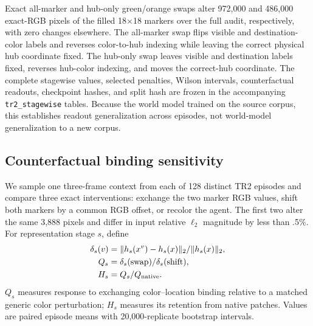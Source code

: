 \documentclass{article}
\begin{document}
Exact all-marker and hub-only green/orange swaps alter 972,000 and 486,000
exact-RGB pixels of the filled 18$\times$18 markers over the full audit,
respectively, with zero changes elsewhere.  The all-marker swap flips visible
and destination-color labels and reverses color-to-hub indexing while leaving
the correct physical hub coordinate fixed.  The hub-only swap leaves visible
and destination labels fixed, reverses hub-color indexing, and moves the
correct-hub coordinate.  The complete stagewise values,
selected penalties, Wilson intervals, counterfactual readouts, checkpoint
hashes, and split hash are frozen in the accompanying \texttt{tr2\_stagewise}
tables.  Because the world model trained on the source corpus, this establishes
readout generalization across episodes, not world-model generalization to a
new corpus.

\subsection{Counterfactual binding sensitivity}
\label{sec:counterfactual}

We sample one three-frame context from each of 128 distinct TR2 episodes and
compare three exact interventions: exchange the two marker RGB values, shift
both markers by a common RGB offset, or recolor the agent.  The first two alter
the same 3,888 pixels and differ in input relative $\ell_2$ magnitude by less
than .5\%.  For representation stage $s$, define
\begin{equation}
\begin{aligned}
 \delta_s(v)&=\|h_s(x^v)-h_s(x)\|_2/\|h_s(x)\|_2,\\
 Q_s&=\delta_s({\rm swap})/\delta_s({\rm shift}),\\
 H_s&=Q_s/Q_{\rm native}.
\end{aligned}
\end{equation}
$Q_s$ measures response to exchanging color--location binding relative to a
matched generic color perturbation; $H_s$ measures its retention from native
patches.  Values are paired episode means with 20,000-replicate bootstrap
intervals.
\end{document}
